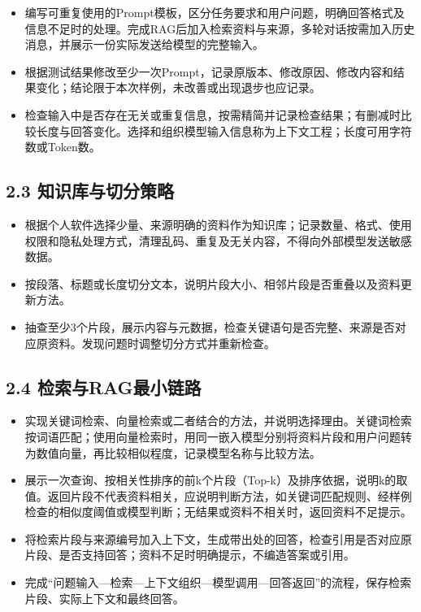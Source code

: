 \documentclass[UTF8,12pt,a4paper]{ctexart}
\begin{document}
\begin{itemize}
  \item 编写可重复使用的Prompt模板，区分任务要求和用户问题，明确回答格式及信息不足时的处理。完成RAG后加入检索资料与来源，多轮对话按需加入历史消息，并展示一份实际发送给模型的完整输入。
  \item 根据测试结果修改至少一次Prompt，记录原版本、修改原因、修改内容和结果变化；结论限于本次样例，未改善或出现退步也应记录。
  \item 检查输入中是否存在无关或重复信息，按需精简并记录检查结果；有删减时比较长度与回答变化。选择和组织模型输入信息称为上下文工程；长度可用字符数或Token数。
\end{itemize}

\subsection*{2.3 知识库与切分策略}

\begin{itemize}
  \item 根据个人软件选择少量、来源明确的资料作为知识库；记录数量、格式、使用权限和隐私处理方式，清理乱码、重复及无关内容，不得向外部模型发送敏感数据。
  \item 按段落、标题或长度切分文本，说明片段大小、相邻片段是否重叠以及资料更新方法。
  \item 抽查至少3个片段，展示内容与元数据，检查关键语句是否完整、来源是否对应原资料。发现问题时调整切分方式并重新检查。
\end{itemize}

\subsection*{2.4 检索与RAG最小链路}

\begin{itemize}
  \item 实现关键词检索、向量检索或二者结合的方法，并说明选择理由。关键词检索按词语匹配；使用向量检索时，用同一嵌入模型分别将资料片段和用户问题转为数值向量，再比较相似程度，记录模型名称与比较方法。
  \item 展示一次查询、按相关性排序的前k个片段（Top-k）及排序依据，说明k的取值。返回片段不代表资料相关，应说明判断方法，如关键词匹配规则、经样例检查的相似度阈值或模型判断；无结果或资料不相关时，返回资料不足提示。
  \item 将检索片段与来源编号加入上下文，生成带出处的回答，检查引用是否对应原片段、是否支持回答；资料不足时明确提示，不编造答案或引用。
  \item 完成“问题输入—检索—上下文组织—模型调用—回答返回”的流程，保存检索片段、实际上下文和最终回答。
\end{itemize}
\end{document}
